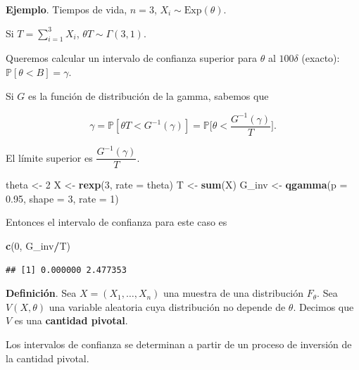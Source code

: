 \documentclass[
  12pt,
]{book}
\newenvironment{Shaded}{\begin{snugshade}}{\end{snugshade}}
\newcommand{\DataTypeTok}[1]{\textcolor[rgb]{0.13,0.29,0.53}{#1}}
\newcommand{\DecValTok}[1]{\textcolor[rgb]{0.00,0.00,0.81}{#1}}
\newcommand{\FloatTok}[1]{\textcolor[rgb]{0.00,0.00,0.81}{#1}}
\newcommand{\KeywordTok}[1]{\textcolor[rgb]{0.13,0.29,0.53}{\textbf{#1}}}
\newcommand{\NormalTok}[1]{#1}
\newcommand{\OperatorTok}[1]{\textcolor[rgb]{0.81,0.36,0.00}{\textbf{#1}}}
\newcommand{\StringTok}[1]{\textcolor[rgb]{0.31,0.60,0.02}{#1}}
\begin{document}
\textbf{Ejemplo}. Tiempos de vida, \(n=3\), \(X_i\sim \text{Exp}(\theta)\).

Si \(T = \sum_{i=1}^3X_i\), \(\theta T\sim \Gamma(3,1)\).

Queremos calcular un intervalo de confianza superior para \(\theta\) al
\(100\delta\) (exacto): \(\mathbb P[\theta<B] = \gamma\).

Si \(G\) es la función de distribución de la gamma, sabemos que

\begin{equation*}
\gamma = \mathbb{P}[\theta T<G^{-1}(\gamma)] = \mathbb{P}\bigg[\theta<\dfrac{G^{-1}(\gamma)}{T}\bigg].
\end{equation*}

El límite superior es \(\dfrac{G^{-1}(\gamma)}{T}\).

\begin{Shaded}
\begin{Highlighting}[]
\NormalTok{theta \textless{}{-}}\StringTok{ }\DecValTok{2}
\NormalTok{X \textless{}{-}}\StringTok{ }\KeywordTok{rexp}\NormalTok{(}\DecValTok{3}\NormalTok{, }\DataTypeTok{rate =}\NormalTok{ theta)}
\NormalTok{T \textless{}{-}}\StringTok{ }\KeywordTok{sum}\NormalTok{(X)}
\NormalTok{G\_inv \textless{}{-}}\StringTok{ }\KeywordTok{qgamma}\NormalTok{(}\DataTypeTok{p =} \FloatTok{0.95}\NormalTok{, }\DataTypeTok{shape =} \DecValTok{3}\NormalTok{, }\DataTypeTok{rate =} \DecValTok{1}\NormalTok{)}
\end{Highlighting}
\end{Shaded}

Entonces el intervalo de confianza para este caso es

\begin{Shaded}
\begin{Highlighting}[]
\KeywordTok{c}\NormalTok{(}\DecValTok{0}\NormalTok{, G\_inv}\OperatorTok{/}\NormalTok{T)}
\end{Highlighting}
\end{Shaded}

\begin{verbatim}
## [1] 0.000000 2.477353
\end{verbatim}

\textbf{Definición}. Sea \(X = (X_1,\dots,X_n)\) una muestra de una distribución
\(F_\theta\). Sea \(V(X,\theta)\) una variable aleatoria cuya distribución no
depende de \(\theta\). Decimos que \(V\) es una \textbf{cantidad pivotal}.

Los intervalos de confianza se determinan a partir de un proceso de inversión de
la cantidad pivotal.
\end{document}
